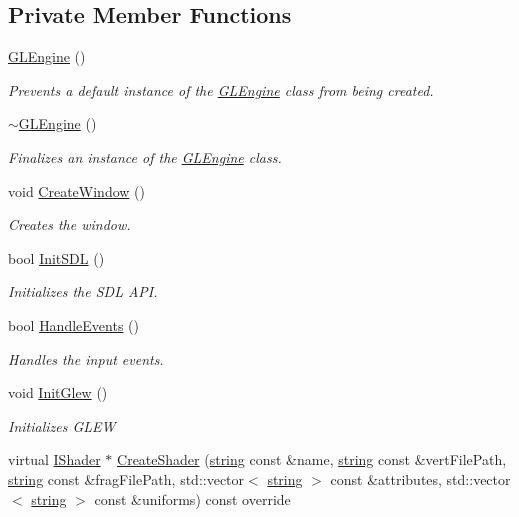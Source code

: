 \subsection*{Private Member Functions}
\begin{DoxyCompactItemize}
\item 
\hyperlink{class_g_l_engine_a3c603b91b3e70a64c3e9472bb293684a}{G\+L\+Engine} ()
\begin{DoxyCompactList}\small\item\em Prevents a default instance of the \hyperlink{class_g_l_engine}{G\+L\+Engine} class from being created. \end{DoxyCompactList}\item 
\hyperlink{class_g_l_engine_a84d21dda5f2ca244b7c1391785767e32}{$\sim$\+G\+L\+Engine} ()
\begin{DoxyCompactList}\small\item\em Finalizes an instance of the \hyperlink{class_g_l_engine}{G\+L\+Engine} class. \end{DoxyCompactList}\item 
void \hyperlink{class_g_l_engine_a6a3de34ef35e375a701387a0b9c5d551}{Create\+Window} ()
\begin{DoxyCompactList}\small\item\em Creates the window. \end{DoxyCompactList}\item 
bool \hyperlink{class_g_l_engine_aa1b26985e390b1befdc1d83248d4252f}{Init\+S\+DL} ()
\begin{DoxyCompactList}\small\item\em Initializes the S\+DL A\+PI. \end{DoxyCompactList}\item 
bool \hyperlink{class_g_l_engine_a1deca7cf5cb99fe0b6c941645d5c6a4e}{Handle\+Events} ()
\begin{DoxyCompactList}\small\item\em Handles the input events. \end{DoxyCompactList}\item 
void \hyperlink{class_g_l_engine_a3a91756215e75cf82c5af4e242b5416c}{Init\+Glew} ()
\begin{DoxyCompactList}\small\item\em Initializes G\+L\+EW \end{DoxyCompactList}\item 
virtual \hyperlink{class_i_shader}{I\+Shader} $\ast$ \hyperlink{class_g_l_engine_a1d34b25ae8e8e0e9fd16bfe78eddb87c}{Create\+Shader} (\hyperlink{_types_8h_ad453f9f71ce1f9153fb748d6bb25e454}{string} const \&name, \hyperlink{_types_8h_ad453f9f71ce1f9153fb748d6bb25e454}{string} const \&vert\+File\+Path, \hyperlink{_types_8h_ad453f9f71ce1f9153fb748d6bb25e454}{string} const \&frag\+File\+Path, std\+::vector$<$ \hyperlink{_types_8h_ad453f9f71ce1f9153fb748d6bb25e454}{string} $>$ const \&attributes, std\+::vector$<$ \hyperlink{_types_8h_ad453f9f71ce1f9153fb748d6bb25e454}{string} $>$ const \&uniforms) const  override

\end{DoxyCompactItemize}
